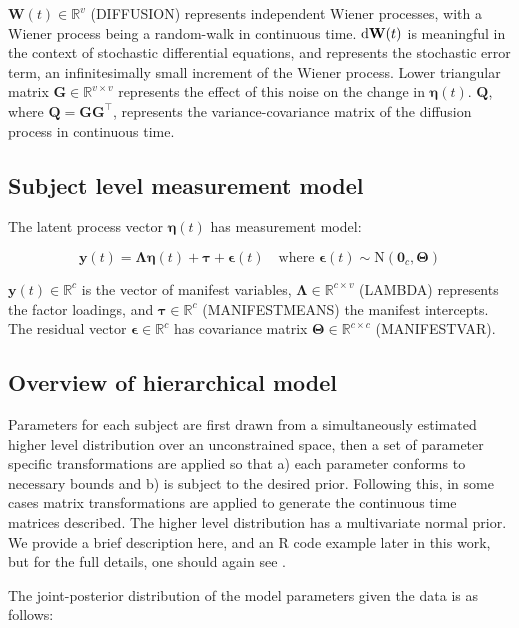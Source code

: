 \documentclass[11pt]{article}\usepackage[]{graphicx}\usepackage[]{color}
\newcommand{\vect}[1]{\boldsymbol{\mathbf{#1}}}
\begin{document}
$\vect{W}(t) \in \mathbb{R}^{v}$ (DIFFUSION) represents independent Wiener processes, with a Wiener process being a random-walk in continuous time. $\textnormal{d}\vect{W}(t)$ is meaningful in the context of stochastic differential equations, and represents the stochastic error term, an infinitesimally small increment of the Wiener process. Lower triangular matrix $\vect{G} \in \mathbb{R}^{v \times v}$ represents the effect of this noise on the change in  $\vect{\eta}(t)$.  $\vect{Q}$, where $\vect{Q} = \vect{GG}^\top$, represents the variance-covariance matrix of the diffusion process in continuous time.

\subsection{Subject level measurement model}
The latent process vector $\vect{\eta}(t)$ has measurement model:

\begin{equation}
	\label{eq:measurement}
	\vect{y}(t) = \vect{\Lambda} \vect{\eta}(t) + \vect{\tau} + \vect{\epsilon}(t)  
	\quad \text{where } \vect{\epsilon}(t) \sim  \mathrm{N} (\vect{0}_c, \vect{\Theta})
\end{equation}

$\vect{y} (t)\in\mathbb{R}^{c}$ is the vector of manifest variables, $\vect{\Lambda} \in \mathbb{R}^{c \times v}$ (LAMBDA) represents the factor loadings, and $\vect{\tau} \in\mathbb{R}^{c}$ (MANIFESTMEANS) the manifest intercepts. The residual vector $\vect{\epsilon} \in \mathbb{R}^{c}$ has covariance matrix $\vect{\Theta} \in\mathbb{R}^{c \times c}$ (MANIFESTVAR).

\subsection{Overview of hierarchical model}
Parameters for each subject are first drawn from a simultaneously estimated higher level distribution over an unconstrained space, then a set of parameter specific transformations are applied so that a) each parameter conforms to necessary bounds and b) is subject to the desired prior. Following this, in some cases matrix transformations are applied to generate the continuous time matrices described. The higher level distribution has a multivariate normal prior. We provide a brief description here, and an R code example later in this work, but for the full details, one should again see \citet{driver2016hierarchical}.

The joint-posterior distribution of the model parameters given the data is as follows:
\end{document}
